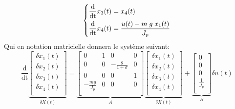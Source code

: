 \documentclass[class=article, crop=false]{standalone}
\begin{document}
\begin{resolution}
\begin{equation*}
\begin{dcases}
            \frac{\text{d}}{\text{dt}} x_3(t) = x_4(t)
            \\
            \frac{\text{d}}{\text{dt}} x_4(t) = \frac{u(t) - m \; g \; x_1(t)}{J_p}
            \\
        \end{dcases}
    \end{equation*}
    Qui en notation matricielle donnera le système suivant:
    \begin{equation*}
        \boxed{
            \frac{\text{d}}{\text{dt}} 
            \underbrace{
            \begin{bmatrix}
                \delta x_{1}(t)\\
                \delta x_{2}(t)\\
                \delta x_{3}(t)\\
                \delta x_{4}(t)\\
            \end{bmatrix}}_{\delta X(t)}
            =
            \underbrace{
                \begin{bmatrix}
                0 & 1 & 0 & 0\\
                0 & 0 & -\frac{g}{1 + \sigma} & 0\\
                0 & 0 & 0 & 1\\
                -\frac{mg}{J_p} & 0 & 0 & 0\\
            \end{bmatrix}}_{A}
            \underbrace{
            \begin{bmatrix}
                \delta x_{1}(t)\\
                \delta x_{2}(t)\\
                \delta x_{3}(t)\\
                \delta x_{4}(t)\\
            \end{bmatrix}}_{\delta X(t)}
            +
            \underbrace{
                \begin{bmatrix}
                0\\
                0\\
                0\\
                \frac{1}{J_p}\\
            \end{bmatrix}}_{B}
            \delta u(t)
        }
    \end{equation*}
\end{resolution}
\end{document}
